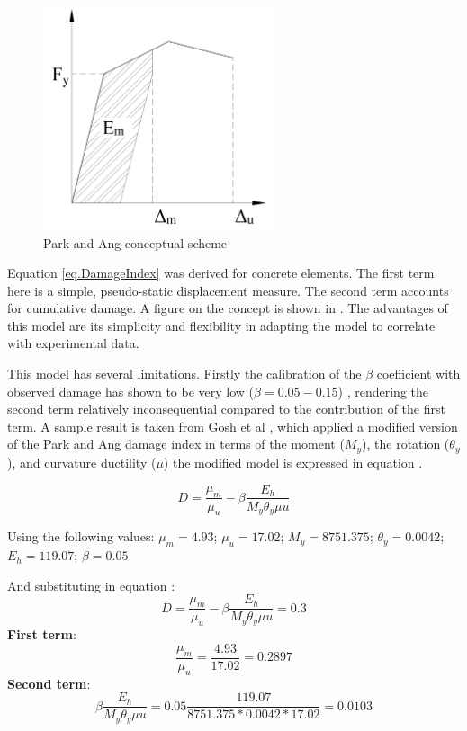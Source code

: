 \begin{figure}[htbp]
\centering
\includegraphics[width=0.6\textwidth]{Chapter-2/figs/Park_and_Ang_Model}
\caption{Park and Ang conceptual scheme}
\label{fig:Paa}
\end{figure}

Equation \ref{eq.DamageIndex} was derived for concrete elements. The first term here is a simple, pseudo-static displacement measure. The second term accounts for cumulative damage. A figure on the concept is shown in . The advantages of this model are its simplicity and flexibility in adapting the model to correlate with experimental data.  

This model has several limitations. Firstly the calibration of the $\beta$ coefficient with observed damage has shown to be very low ($\beta=0.05-0.15$) \cite{Young-JiPark1985} \cite{Ghosh2015}, rendering the second term relatively inconsequential compared to the contribution of the first term. A sample result is taken from Gosh et al \cite{Ghosh2015}, which applied a modified version of the Park and Ang damage index in terms of the moment ($M_{y}$), the rotation ($\theta_y$), and curvature ductility ($\mu$) the modified model is expressed in equation .

\begin{equation}
	D=\frac{\mu_{m}}{\mu_{u}}-\beta\frac{E_h}{M_{y}\theta_y\mu{u}}
	\label{eq.DamageIndexGhosh}
\end{equation}

Using the following values: $\mu_{m}=4.93$; $\mu_{u}=17.02$; $M_{y}=8751.375$; $\theta_y=0.0042$; $E_{h}=119.07$; $\beta=0.05$ 

And substituting in equation :
\[
 D=\frac{\mu_{m}}{\mu_{u}}-\beta\frac{E_h}{M_{y}\theta_y\mu{u}}=0.3
	\]
\textbf{First term}:
\[
\frac{\mu_{m}}{\mu_{u}}=\frac{4.93}{17.02}=0.2897
\]
\textbf{Second term}: 
\[	
	\beta \frac{E_h}{M_{y}\theta_y\mu{u}}=0.05\frac{119.07}{8751.375*0.0042*17.02}=0.0103
\]

